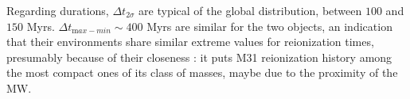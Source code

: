 \documentclass[twocolumn]{aastex61}
\begin{document}
Regarding durations, $\Delta t_{2\sigma}$ are typical of the global distribution, between $100$ and $150$ Myrs. $\Delta t_{\mathrm max-min} \sim 400$ Myrs are similar for the two objects, an indication that their environments share similar extreme values for reionization times, presumably because of their closeness : it puts M31 reionization history among the most compact ones of its class of masses, maybe due to the proximity of the MW.


%
%
% 
\end{document}
